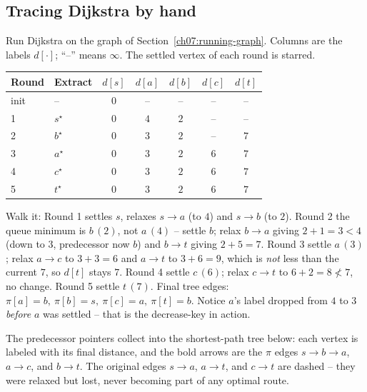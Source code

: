 \subsection{Tracing Dijkstra by hand}

\begin{labbox}
Run Dijkstra on the graph of Section~\ref{ch07:running-graph}. Columns are the labels
$d[\cdot]$; ``--'' means $\infty$. The settled vertex of each round is starred.

\medskip
\begin{center}
\begin{tabular}{llccccc}
\toprule
Round & Extract & $d[s]$ & $d[a]$ & $d[b]$ & $d[c]$ & $d[t]$ \\
\midrule
init  & --        & $0$ & -- & -- & -- & -- \\
1 & $s^\star$ & $0$ & $4$ & $2$ & -- & -- \\
2 & $b^\star$ & $0$ & $3$ & $2$ & -- & $7$ \\
3 & $a^\star$ & $0$ & $3$ & $2$ & $6$ & $7$ \\
4 & $c^\star$ & $0$ & $3$ & $2$ & $6$ & $7$ \\
5 & $t^\star$ & $0$ & $3$ & $2$ & $6$ & $7$ \\
\bottomrule
\end{tabular}
\end{center}

\medskip
Walk it: Round 1 settles $s$, relaxes $s\to a$ (to $4$) and $s\to b$ (to $2$). Round 2 the
queue minimum is $b\,(2)$, not $a\,(4)$ -- settle $b$; relax $b\to a$ giving $2+1=3<4$ (down
to $3$, predecessor now $b$) and $b\to t$ giving $2+5=7$. Round 3 settle $a\,(3)$; relax
$a\to c$ to $3+3=6$ and $a\to t$ to $3+6=9$, which is \emph{not} less than the current $7$,
so $d[t]$ stays $7$. Round 4 settle $c\,(6)$; relax $c\to t$ to $6+2=8\not<7$, no change.
Round 5 settle $t\,(7)$. Final tree edges: $\pi[a]=b,\ \pi[b]=s,\ \pi[c]=a,\ \pi[t]=b$.
Notice $a$'s label dropped from $4$ to $3$ \emph{before} $a$ was settled -- that is the
decrease-key in action.
\end{labbox}

The predecessor pointers collect into the shortest-path tree below: each vertex is labeled
with its final distance, and the bold arrows are the $\pi$ edges $s\to b\to a$, $a\to c$,
and $b\to t$. The original edges $s\to a$, $a\to t$, and $c\to t$ are dashed -- they were relaxed but
lost, never becoming part of any optimal route.

